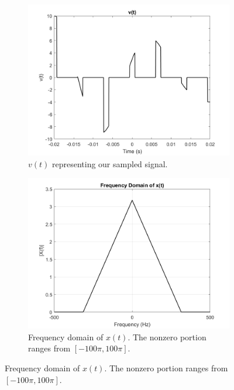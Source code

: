 \documentclass[12pt]{article}
\begin{document}
\begin{enumerate}[\qquad 1)]
\begin{figure}[htbp]
    \vspace{0.5em}

    \begin{subfigure}[t]{0.48\textwidth}
        \centering
        \includegraphics[width=1.0\textwidth]{images/vt.png}
        \caption{$v(t)$ representing our sampled signal.}
        \label{fig:image3}
    \end{subfigure}
    \begin{subfigure}[t]{0.48\textwidth}
        \centering
        \includegraphics[width=1.0\textwidth]{images/reconstructionXofT.png}
        \caption{Frequency domain of $x(t)$. The nonzero portion ranges from $[-100\pi, 100\pi]$.}
        \label{fig:image4}
    \end{subfigure}


\end{figure}
\end{enumerate}
\end{document}
